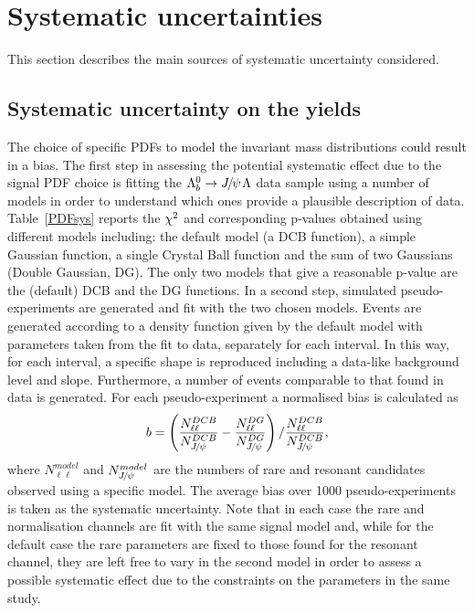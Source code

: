 \section{Systematic uncertainties}
\label{sec:Lb_sys}

This section describes the main sources of systematic uncertainty considered.

\subsection{Systematic uncertainty on the yields}
\label{sec:Lb_yield_sys}

The choice of specific PDFs to model the invariant mass distributions could result
in a bias. The first step in assessing the potential systematic effect due to the signal PDF choice is fitting 
 the $\Lb\to\jpsi\Lz$ data sample using a number of models in order to understand which ones provide a plausible 
 description of data. Table~\ref{PDFsys} reports the $\chi^2$ and corresponding p-values obtained using different
models including: the default model (a DCB function), a simple Gaussian function,
a single Crystal Ball function and the sum of two Gaussians (Double Gaussian, DG). The only two models that
give a reasonable p-value are the (default) DCB and the DG functions.
In a second step, simulated pseudo-experiments are generated and fit with the two chosen models.
Events are generated according to a density function given by the default model with parameters taken
from the fit to data, separately for each \qsq interval. In this way, for each \qsq interval, a specific
shape is reproduced including a data-like background level and slope. Furthermore, a number 
of events comparable to that found in data is generated. For each pseudo-experiment a normalised
bias is calculated as
%
\begin{equation}
b = \left(\frac{N^{DCB}_{\ell\ell}}{N^{DCB}_{\jpsi}} - \frac{N^{DG}_{\ell\ell}}{N^{DG}_{\jpsi}}\right) / \frac{N^{DCB}_{\ell\ell}}{N^{DCB}_{\jpsi}},
\end{equation}
%
where $N^{model}_{\ell\ell}$ and $N^{model}_{\jpsi}$ are the numbers of rare and resonant candidates
observed using a specific model. %
The average bias over 1000 pseudo-experiments is taken
as the systematic uncertainty. Note that in each case the rare and normalisation channels are fit
with the same signal model and, while for the default case the rare parameters are fixed to those found
for the resonant channel, they are left free to vary in the second model in order to assess
a possible systematic effect due to the constraints on the parameters in the same study.

